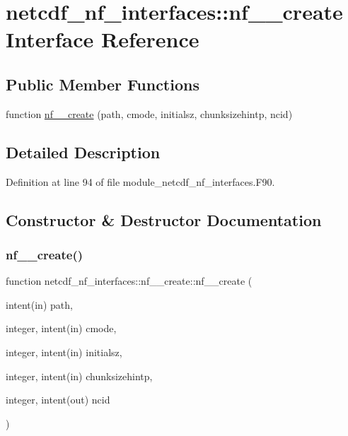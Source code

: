 \hypertarget{interfacenetcdf__nf__interfaces_1_1nf____create}{}\section{netcdf\+\_\+nf\+\_\+interfaces\+:\+:nf\+\_\+\+\_\+create Interface Reference}
\label{interfacenetcdf__nf__interfaces_1_1nf____create}
\subsection*{Public Member Functions}
\begin{DoxyCompactItemize}
\item 
function \hyperlink{interfacenetcdf__nf__interfaces_1_1nf____create_a83675b6ec9ff352190587ab5663161f5}{nf\+\_\+\+\_\+create} (path, cmode, initialsz, chunksizehintp, ncid)
\end{DoxyCompactItemize}


\subsection{Detailed Description}


Definition at line 94 of file module\+\_\+netcdf\+\_\+nf\+\_\+interfaces.\+F90.



\subsection{Constructor \& Destructor Documentation}
\mbox{\label{interfacenetcdf__nf__interfaces_1_1nf____create_a83675b6ec9ff352190587ab5663161f5}} 
\subsubsection{\texorpdfstring{nf\+\_\+\+\_\+create()}{nf\_\_create()}}
{\footnotesize\ttfamily function netcdf\+\_\+nf\+\_\+interfaces\+::nf\+\_\+\+\_\+create\+::nf\+\_\+\+\_\+create (\begin{DoxyParamCaption}\item[{intent(in)}]{path,  }\item[{integer, intent(in)}]{cmode,  }\item[{integer, intent(in)}]{initialsz,  }\item[{integer, intent(in)}]{chunksizehintp,  }\item[{integer, intent(out)}]{ncid }\end{DoxyParamCaption})}



